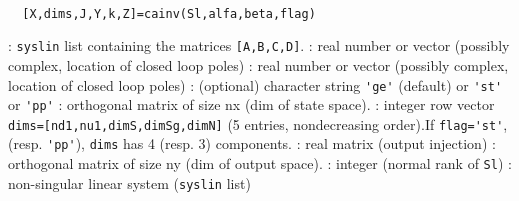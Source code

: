 \begin{mandesc}
   \\ %
\end{mandesc}
\begin{calling_sequence}
\begin{verbatim}
  [X,dims,J,Y,k,Z]=cainv(Sl,alfa,beta,flag)  
\end{verbatim}
\end{calling_sequence}
\begin{parameters}
  \begin{varlist}
    : \verb!syslin! list containing the matrices \verb![A,B,C,D]!.
    : real number or vector (possibly complex, location of closed loop poles)
    : real number or vector (possibly complex, location of closed loop poles)
    : (optional) character string \verb!'ge'! (default) or \verb!'st'! or \verb!'pp'!
    : orthogonal matrix of size nx (dim of state space).
    : integer row vector \verb!dims=[nd1,nu1,dimS,dimSg,dimN]!  (5
    entries, nondecreasing order).If \verb!flag='st'!, (resp. \verb!'pp'!),
    \verb!dims! has 4 (resp. 3) components.
    : real matrix (output injection)
    : orthogonal matrix of size ny (dim of output space).
    : integer (normal rank of \verb!Sl!)
    : non-singular linear system (\verb!syslin! list)
  \end{varlist}
\end{parameters}
